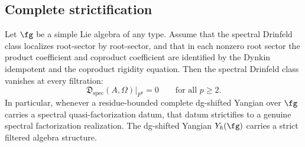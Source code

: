 \subsection{Complete strictification}

\begin{theorem}
\label{thm:complete-strictification-v1}
Let $\fg$ be a simple Lie algebra of any type. Assume that the
spectral Drinfeld class localizes root-sector by root-sector, and
that in each nonzero root sector the product coefficient and coproduct
coefficient are identified by the Dynkin idempotent and the coproduct
rigidity equation. Then the spectral Drinfeld class vanishes at every
filtration:
\[
\mathfrak{D}_{\mathrm{spec}}(A,\Omega)\big|_{F^p}=0
\qquad\text{for all }p\ge 2.
\]
In particular, whenever a residue-bounded complete dg-shifted Yangian
over $\fg$ carries a spectral quasi-factorization datum, that datum
strictifies to a genuine spectral factorization realization.
The dg-shifted Yangian $Y_\hbar(\fg)$ carries a strict filtered
algebra structure.
\end{theorem}


